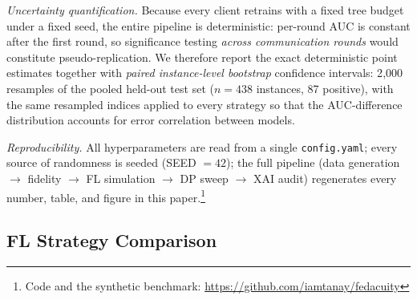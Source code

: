 \documentclass[journal]{IEEEtran}
\begin{document}
\textit{Uncertainty quantification.} Because every client retrains with a fixed
tree budget under a fixed seed, the entire pipeline is deterministic: per-round
AUC is constant after the first round, so significance testing \emph{across
communication rounds} would constitute pseudo-replication. We therefore report
the exact deterministic point estimates together with \emph{paired
instance-level bootstrap} confidence intervals: 2{,}000 resamples of the pooled
held-out test set ($n=438$ instances, 87 positive), with the same resampled
indices applied to every strategy so that the AUC-difference distribution
accounts for error correlation between models.

\textit{Reproducibility.} All hyperparameters are read from a single
\texttt{config.yaml}; every source of randomness is seeded (SEED $=42$); the
full pipeline (data generation $\rightarrow$ fidelity $\rightarrow$ FL
simulation $\rightarrow$ DP sweep $\rightarrow$ XAI audit) regenerates every
number, table, and figure in this paper.\footnote{Code and the synthetic
benchmark: \url{https://github.com/iamtanay/fedacuity}}

\subsection{FL Strategy Comparison}
\end{document}
